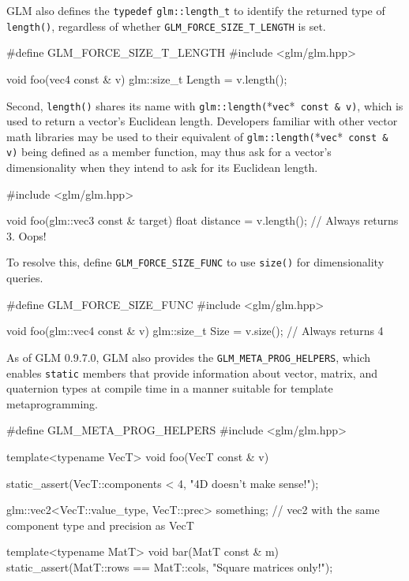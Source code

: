 \documentclass{scrartcl}
\numberwithin{figure}{subsection}
\begin{document}
GLM also defines the \verb|typedef| \verb|glm::length_t| to identify the returned type of \verb|length()|, regardless of whether \verb|GLM_FORCE_SIZE_T_LENGTH| is set.

\begin{cppcode}
#define GLM_FORCE_SIZE_T_LENGTH 
#include <glm/glm.hpp>

void foo(vec4 const & v)
{
  glm::size_t Length = v.length();
}
\end{cppcode}

Second, \verb|length()| shares its name with \verb|glm::length(|*\verb|vec|*\verb| const & v)|, which is used to return a vector's Euclidean length. Developers familiar with other vector math libraries may be used to their equivalent of \verb|glm::length(|*\verb|vec|*\verb| const & v)| being defined as a member function, may thus ask for a vector's dimensionality when they intend to ask for its Euclidean length.

\begin{cppcode}
#include <glm/glm.hpp>

void foo(glm::vec3 const & target)
{
  float distance = v.length();  // Always returns 3.  Oops!
}
\end{cppcode}

To resolve this, define \verb|GLM_FORCE_SIZE_FUNC| to use \verb|size()| for dimensionality queries.

\begin{cppcode}
#define GLM_FORCE_SIZE_FUNC 
#include <glm/glm.hpp>

void foo(glm::vec4 const & v)
{
  glm::size_t Size = v.size();  // Always returns 4
}
\end{cppcode}

As of GLM 0.9.7.0, GLM also provides the \verb|GLM_META_PROG_HELPERS|, which enables \verb|static| members that provide information about vector, matrix, and quaternion types at compile time in a manner suitable for template metaprogramming.

\begin{cppcode}
#define GLM_META_PROG_HELPERS
#include <glm/glm.hpp>

template<typename VecT>
void foo(VecT const & v)
{
  static_assert(VecT::components < 4, "4D doesn't make sense!");

  glm::vec2<VecT::value_type, VecT::prec> something;
  // vec2 with the same component type and precision as VecT
}

template<typename MatT>
void bar(MatT const & m)
{
  static_assert(MatT::rows == MatT::cols, "Square matrices only!");
}
\end{cppcode}
\end{document}
